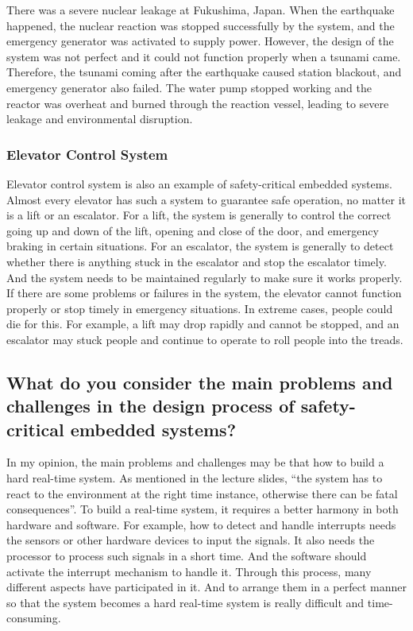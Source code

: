 \documentclass[10pt]{article}
\begin{document}
There was a severe nuclear leakage at Fukushima, Japan. When the earthquake happened, the nuclear reaction was stopped successfully by the system, and the emergency generator was activated to supply power. However, the design of the system was not perfect and it could not function properly when a tsunami came. Therefore, the tsunami coming after the earthquake caused station blackout, and emergency generator also failed. The water pump stopped working and the reactor was overheat and burned through the reaction vessel, leading to severe leakage and environmental disruption.

\subsubsection{Elevator Control System}

Elevator control system is also an example of safety-critical embedded systems. Almost every elevator has such a system to guarantee safe operation, no matter it is a lift or an escalator. For a lift, the system is generally to control the correct going up and down of the lift, opening and close of the door, and emergency braking in certain situations. For an escalator, the system is generally to detect whether there is anything stuck in the escalator and stop the escalator timely. And the system needs to be maintained regularly to make sure it works properly. If there are some problems or failures in the system, the elevator cannot function properly or stop timely in emergency situations. In extreme cases, people could die for this. For example, a lift may drop rapidly and cannot be stopped, and an escalator may stuck people and continue to operate to roll people into the treads.


\subsection{What do you consider the main problems and challenges in the design process of safety-critical embedded systems?}

In my opinion, the main problems and challenges may be that how to build a hard real-time system. As mentioned in the lecture slides, ``the system has to react to the environment at the right time instance, otherwise there can be fatal consequences''. To build a real-time system, it requires a better harmony in both hardware and software. For example, how to detect and handle interrupts needs the sensors or other hardware devices to input the signals. It also needs the processor to process such signals in a short time. And the software should activate the interrupt mechanism to handle it. Through this process, many different aspects have participated in it. And to arrange them in a perfect manner so that the system becomes a hard real-time system is really difficult and time-consuming.
\end{document}
